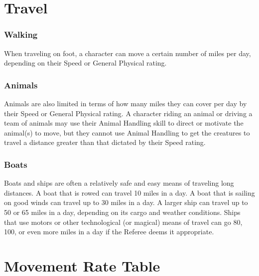\documentclass[oneside]{book}
\begin{document}
\begin{multicols}{2}
\section{Travel}
\subsubsection{Walking}
When traveling on foot, a character can move a certain number of miles per day, depending on their Speed or General Physical rating.

\subsubsection{Animals}
Animals are also limited in terms of how many miles they can cover per day by their Speed or General Physical rating. A character riding an animal or driving a team of animals may use their Animal Handling skill to direct or motivate the animal(s) to move, but they cannot use Animal Handling to get the creatures to travel a distance greater than that dictated by their Speed rating.

\subsubsection{Boats}
Boats and ships are often a relatively safe and easy means of traveling long distances. A boat that is rowed can travel 10 miles in a day. A boat that is sailing on good winds can travel up to 30 miles in a day. A larger ship can travel up to 50 or 65 miles in a day, depending on its cargo and weather conditions. Ships that use motors or other technological (or magical) means of travel can go 80, 100, or even more miles in a day if the Referee deems it appropriate. 

\section{Movement Rate Table}


\end{multicols}
\end{document}
